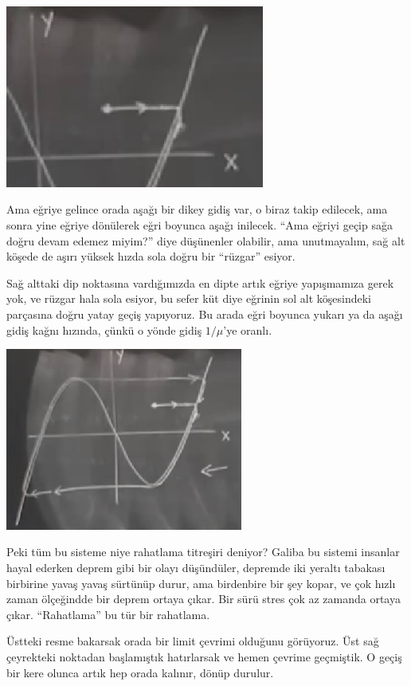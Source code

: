 \documentclass[12pt,fleqn]{article}\usepackage{../../common}
\begin{document}
\includegraphics[height=6cm]{10_03.png}

Ama eğriye gelince orada aşağı bir dikey gidiş var, o biraz takip edilecek, ama
sonra yine eğriye dönülerek eğri boyunca aşağı inilecek. ``Ama eğriyi geçip sağa
doğru devam edemez miyim?'' diye düşünenler olabilir, ama unutmayalım, sağ alt
köşede de aşırı yüksek hızda sola doğru bir ``rüzgar'' esiyor.

Sağ alttaki dip noktasına vardığımızda en dipte artık eğriye yapışmamıza gerek
yok, ve rüzgar hala sola esiyor, bu sefer küt diye eğrinin sol alt köşesindeki
parçasına doğru yatay geçiş yapıyoruz. Bu arada eğri boyunca yukarı ya da aşağı
gidiş kağnı hızında, çünkü o yönde gidiş $1/\mu$'ye oranlı.

\includegraphics[height=6cm]{10_02.png}

Peki tüm bu sisteme niye rahatlama titreşiri deniyor? Galiba bu sistemi insanlar
hayal ederken deprem gibi bir olayı düşündüler, depremde iki yeraltı tabakası
birbirine yavaş yavaş sürtünüp durur, ama birdenbire bir şey kopar, ve çok hızlı
zaman ölçeğindde bir deprem ortaya çıkar. Bir sürü stres çok az zamanda ortaya
çıkar. ``Rahatlama'' bu tür bir rahatlama.

Üstteki resme bakarsak orada bir limit çevrimi olduğunu görüyoruz. Üst sağ
çeyrekteki noktadan başlamıştık hatırlarsak ve hemen çevrime geçmiştik. O geçiş
bir kere olunca artık hep orada kalınır, dönüp durulur.
\end{document}
